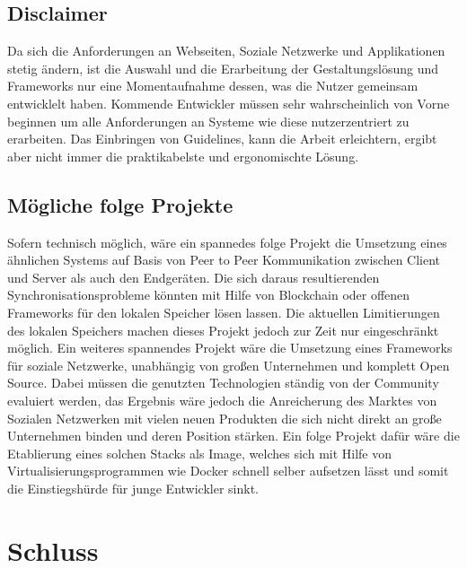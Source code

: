 \section{Disclaimer}
Da sich die Anforderungen an Webseiten, Soziale Netzwerke und Applikationen stetig ändern, ist die Auswahl und die Erarbeitung der Gestaltungslösung und Frameworks nur eine Momentaufnahme dessen, was die Nutzer gemeinsam entwicklelt haben. Kommende Entwickler müssen sehr wahrscheinlich von Vorne beginnen um alle Anforderungen an Systeme wie diese nutzerzentriert zu erarbeiten. Das Einbringen von Guidelines, kann die Arbeit erleichtern, ergibt aber nicht immer die praktikabelste und ergonomischte Lösung.

\section{Mögliche folge Projekte}
Sofern technisch möglich, wäre ein spannedes folge Projekt die Umsetzung eines ähnlichen Systems auf Basis von Peer to Peer Kommunikation zwischen Client und Server als auch den Endgeräten. Die sich daraus resultierenden Synchronisationsprobleme könnten mit Hilfe von Blockchain oder offenen Frameworks für den lokalen Speicher lösen lassen. Die aktuellen Limitierungen des lokalen Speichers machen dieses Projekt jedoch zur Zeit nur eingeschränkt möglich.
Ein weiteres spannendes Projekt wäre die Umsetzung eines Frameworks für soziale Netzwerke, unabhängig von großen Unternehmen und komplett Open Source. Dabei müssen die genutzten Technologien ständig von der Community evaluiert werden, das Ergebnis wäre jedoch die Anreicherung des Marktes von Sozialen Netzwerken mit vielen neuen Produkten die sich nicht direkt an große Unternehmen binden und deren Position stärken.
Ein folge Projekt dafür wäre die Etablierung eines solchen Stacks als Image, welches sich mit Hilfe von Virtualisierungsprogrammen wie Docker schnell selber aufsetzen lässt und somit die Einstiegshürde für junge Entwickler sinkt.

\chapter{Schluss}
\label{cha:Schluss}

